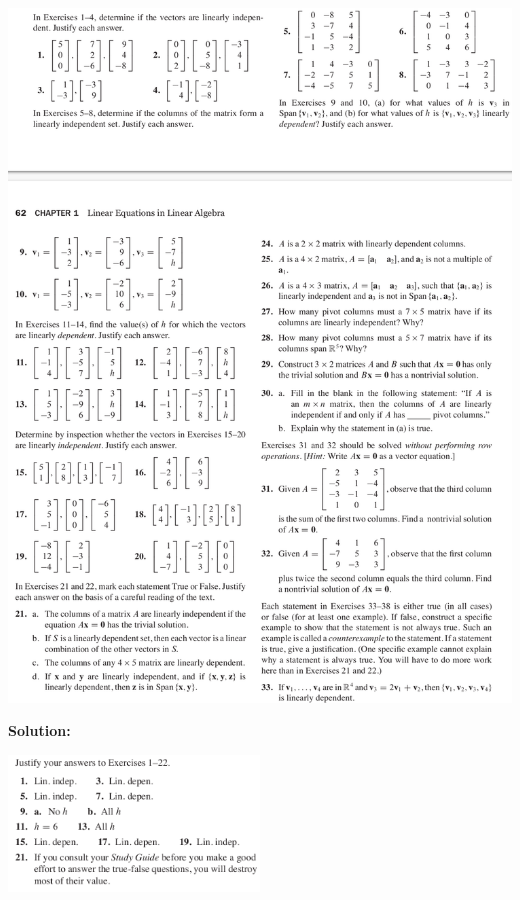\documentclass[a4paper,11pt,reqno]{amsart}
\numberwithin{equation}{section}
\begin{document}
\includegraphics[width=\textwidth]{exercises/li.png}

\newpage

\textbf{Solution:}

\includegraphics[width=0.5\textwidth]{exercises/li_ans1.png}
\end{document}
